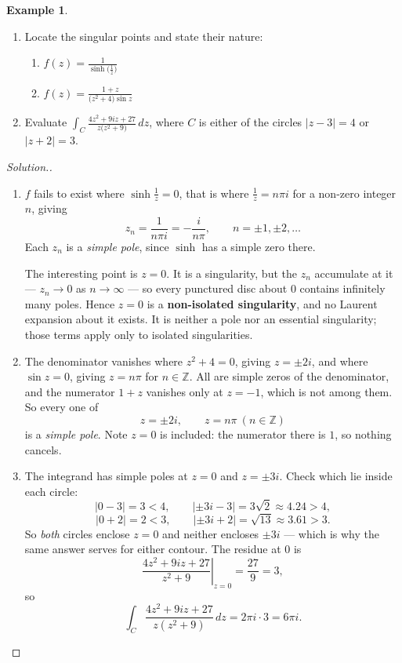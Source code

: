 \documentclass[11pt,a4paper]{article}
\theoremstyle{definition}
\newtheorem{example}[thm]{Example}
\newenvironment{solution}
  {\renewcommand{\qedsymbol}{}\begin{proof}[\textit{Solution}.]}
  {\end{proof}}
\begin{document}
\begin{example}
\begin{enumerate}
\item Locate the singular points and state their nature:
\begin{enumerate}
\item $\displaystyle{f(z) = \frac{1}{\sinh\big(\frac{1}{z}\big)}}$
\item $\displaystyle{f(z) = \frac{1 + z}{\big(z^2 + 4\big)\sin z}}$
\end{enumerate}
\item Evaluate $\displaystyle{\int_C \frac{4z^2 + 9iz + 27}{z \big( z^2 + 9\big)}\,dz}$,
where $C$ is either of the circles $\left|z - 3\right| = 4$ or
$\left|z + 2\right| = 3$.
\end{enumerate}
\end{example}
\begin{solution}
\begin{enumerate}
\item[(1a)] $f$ fails to exist where $\sinh\frac1z=0$, that is where
$\frac1z=n\pi i$ for a non-zero integer $n$, giving
$$z_n=\frac{1}{n\pi i}=-\frac{i}{n\pi},\qquad n=\pm 1,\pm 2,\dots$$
Each $z_n$ is a \emph{simple pole}, since $\sinh$ has a simple zero there.

The interesting point is $z=0$. It is a singularity, but the $z_n$ accumulate
at it --- $z_n\rightarrow 0$ as $n\rightarrow\infty$ --- so every punctured disc
about $0$ contains infinitely many poles. Hence $z=0$ is a \textbf{non-isolated
singularity}, and no Laurent expansion about it exists. It is neither a pole nor
an essential singularity; those terms apply only to isolated singularities.

\item[(1b)] The denominator vanishes where $z^2+4=0$, giving $z=\pm 2i$, and
where $\sin z=0$, giving $z=n\pi$ for $n\in\mathbb{Z}$. All are simple zeros of
the denominator, and the numerator $1+z$ vanishes only at $z=-1$, which is not
among them. So every one of
$$z=\pm 2i,\qquad z=n\pi\ (n\in\mathbb{Z})$$
is a \emph{simple pole}. Note $z=0$ is included: the numerator there is $1$, so
nothing cancels.

\item[(2)] The integrand has simple poles at $z=0$ and $z=\pm 3i$. Check which
lie inside each circle:
$$\left|0-3\right|=3<4,\qquad \left|\pm 3i-3\right|=3\sqrt2\approx 4.24>4,$$
$$\left|0+2\right|=2<3,\qquad \left|\pm 3i+2\right|=\sqrt{13}\approx 3.61>3 .$$
So \emph{both} circles enclose $z=0$ and neither encloses $\pm 3i$ --- which is
why the same answer serves for either contour. The residue at $0$ is
$$\left.\frac{4z^2+9iz+27}{z^2+9}\right|_{z=0}=\frac{27}{9}=3 ,$$
so
$$\int_C \frac{4z^2+9iz+27}{z(z^2+9)}\,dz=2\pi i\cdot 3=6\pi i .$$
\end{enumerate}
\end{solution}
\end{document}
